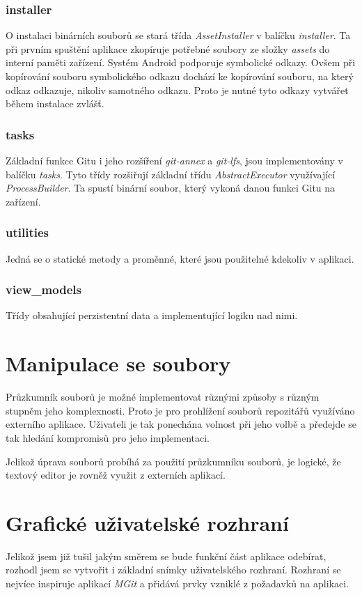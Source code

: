         \subsubsection{installer}
        O instalaci binárních souborů se stará třída \emph{AssetInstaller} v balíčku \emph{installer}. Ta při prvním spuštění aplikace zkopíruje potřebné soubory ze složky \emph{assets} do interní paměti zařízení. Systém Android podporuje symbolické odkazy. Ovšem při kopírování souboru symbolického odkazu dochází ke kopírování souboru, na který odkaz odkazuje, nikoliv samotného odkazu. Proto je nutné tyto odkazy vytvářet během instalace zvlášť.

        \subsubsection{tasks}
        Základní funkce Gitu i jeho rozšíření \emph{git-annex} a \emph{git-lfs}, jsou implementovány v balíčku \emph{tasks}. Tyto třídy rozšiřují základní třídu \emph{AbstractExecutor} využívající \emph{ProcessBuilder}. Ta spustí binární soubor, který vykoná danou funkci Gitu na zařízení.

        \subsubsection{utilities}
        Jedná se o statické metody a proměnné, které jsou použitelné kdekoliv v aplikaci.

        \subsubsection{view\_models}
        Třídy obsahující perzistentní data a implementující logiku nad nimi.

    \newpage
    \section{Manipulace se soubory}
    Průzkumník souborů je možné implementovat různými způsoby s různým stupněm jeho komplexnosti. Proto je pro prohlížení souborů repozitářů využíváno externího aplikace. Uživateli je tak ponechána volnost při jeho volbě a předejde se tak hledání kompromisů pro jeho implementaci.

    Jelikož úprava souborů probíhá za použití průzkumníku souborů, je logické, že textový editor je rovněž využit z externích aplikací.

    \section{Grafické uživatelské rozhraní}
    Jelikož jsem již tušil jakým směrem se bude funkční část aplikace odebírat, rozhodl jsem se vytvořit i základní snímky uživatelského rozhraní. Rozhraní se nejvíce inspiruje aplikací \emph{MGit} a přidává prvky vzniklé z požadavků na aplikaci.

